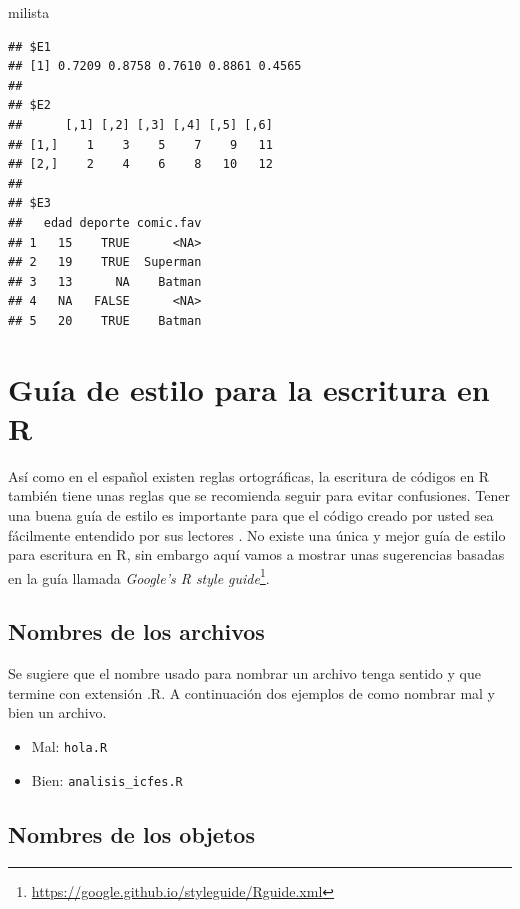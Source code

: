 \documentclass[10pt,]{krantz}
\makeatletter
\newenvironment{Shaded}{\begin{snugshade}}{\end{snugshade}}
\newcommand{\NormalTok}[1]{{#1}}
\let\proglang=\textsf
\renewcommand{\href}[2]{#2\footnote{\url{#1}}}
\newenvironment{kframe}{%
\medskip{}
\setlength{\fboxsep}{.8em}
 \def\at@end@of@kframe{}%
 \ifinner\ifhmode%
  \def\at@end@of@kframe{\end{minipage}}%
  \begin{minipage}{\columnwidth}%
 \fi\fi%
 \def\FrameCommand##1{\hskip\@totalleftmargin \hskip-\fboxsep
 \colorbox{shadecolor}{##1}\hskip-\fboxsep
     \hskip-\linewidth \hskip-\@totalleftmargin \hskip\columnwidth}%
 \MakeFramed {\advance\hsize-\width
   \@totalleftmargin\z@ \linewidth\hsize
   \@setminipage}}%
 {\par\unskip\endMakeFramed%
 \at@end@of@kframe}
\renewenvironment{Shaded}{\begin{kframe}}{\end{kframe}}
\makeatother
\begin{document}
\begin{Shaded}
\begin{Highlighting}[]
\NormalTok{milista}
\end{Highlighting}
\end{Shaded}

\begin{verbatim}
## $E1
## [1] 0.7209 0.8758 0.7610 0.8861 0.4565
## 
## $E2
##      [,1] [,2] [,3] [,4] [,5] [,6]
## [1,]    1    3    5    7    9   11
## [2,]    2    4    6    8   10   12
## 
## $E3
##   edad deporte comic.fav
## 1   15    TRUE      <NA>
## 2   19    TRUE  Superman
## 3   13      NA    Batman
## 4   NA   FALSE      <NA>
## 5   20    TRUE    Batman
\end{verbatim}

\section{Guía de estilo para la escritura en R} \label{sec:estilo}

Así como en el español existen reglas ortográficas, la escritura de
códigos en \proglang{R} también tiene unas reglas que se recomienda
seguir para evitar confusiones. Tener una buena guía de estilo
 es importante para que el código creado por usted
sea fácilmente entendido por sus lectores \citet{rpackages}. No existe
una única y mejor guía de estilo para escritura en \proglang{R}, sin
embargo aquí vamos a mostrar unas sugerencias basadas en la guía llamada
\href{https://google.github.io/styleguide/Rguide.xml}{\textit{Google's R style guide}}.

\subsection{Nombres de los archivos}

Se sugiere que el nombre usado para nombrar un archivo tenga sentido y
que termine con extensión .R. A continuación dos ejemplos de como
nombrar mal y bien un archivo.

\begin{itemize}
    \item Mal: \verb|hola.R|
    \item Bien: \verb|analisis_icfes.R|
\end{itemize}

\subsection{Nombres de los objetos}
\end{document}
